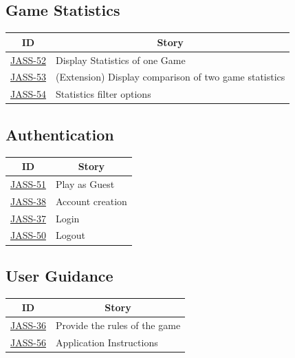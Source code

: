 \subsection{Game Statistics}
\begin{tabular} { | m{1.75 cm} | m{5.25cm} | }
    \hline
    \multicolumn{1}{|c|}{ \textbf{ID}} & \multicolumn{1}{|c|}{ \textbf{Story} }  \\
    \hline
    \href{https://jasstracker-jira.atlassian.net/browse/JASS-52}{JASS-52} & Display Statistics of one Game \\
    \hline
    \href{https://jasstracker-jira.atlassian.net/browse/JASS-53}{JASS-53} & (Extension) Display comparison of two game statistics \\
    \hline
    \href{https://jasstracker-jira.atlassian.net/browse/JASS-54}{JASS-54} & Statistics filter options \\
    \hline
\end{tabular}

\subsection{Authentication}
\begin{tabular} { | m{1.75 cm} | m{5.25cm} | }
    \hline
    \multicolumn{1}{|c|}{ \textbf{ID}} & \multicolumn{1}{|c|}{ \textbf{Story} }  \\
    \hline
    \href{https://jasstracker-jira.atlassian.net/browse/JASS-51}{JASS-51} & Play as Guest \\
    \hline
    \href{https://jasstracker-jira.atlassian.net/browse/JASS-38}{JASS-38} & Account creation \\
    \hline
    \href{https://jasstracker-jira.atlassian.net/browse/JASS-37}{JASS-37} & Login \\
    \hline
    \href{https://jasstracker-jira.atlassian.net/browse/JASS-50}{JASS-50} & Logout \\
    \hline
\end{tabular}

\subsection{User Guidance}
\begin{tabular} { | m{1.75 cm} | m{5.25cm} | }
    \hline
    \multicolumn{1}{|c|}{ \textbf{ID}} & \multicolumn{1}{|c|}{ \textbf{Story} }  \\
    \hline
    \href{https://jasstracker-jira.atlassian.net/browse/JASS-36}{JASS-36} & Provide the rules of the game \\
    \hline
    \href{https://jasstracker-jira.atlassian.net/browse/JASS-56}{JASS-56} & Application Instructions \\
    \hline
\end{tabular}

